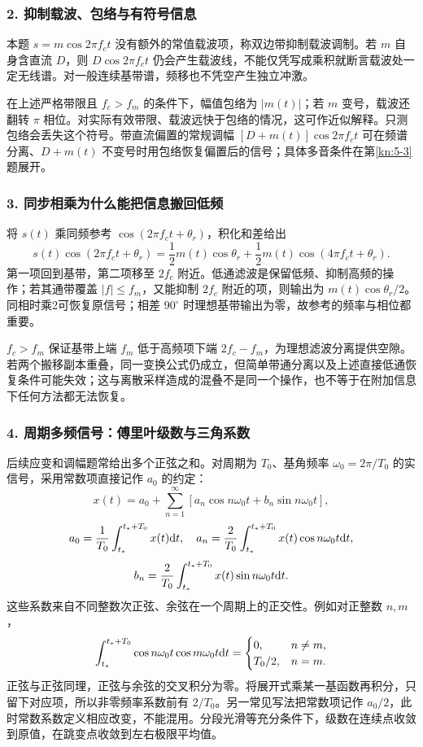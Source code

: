 \subsubsection*{2. 抑制载波、包络与有符号信息}
本题 $s=m\cos2\pi f_ct$ 没有额外的常值载波项，称双边带抑制载波调制。若 $m$ 自身含直流 $D$，则 $D\cos2\pi f_ct$ 仍会产生载波线，不能仅凭写成乘积就断言载波处一定无线谱。对一般连续基带谱，频移也不凭空产生独立冲激。

在上述严格带限且 $f_c>f_m$ 的条件下，幅值包络为 $|m(t)|$；若 $m$ 变号，载波还翻转 $\pi$ 相位。对实际有效带限、载波远快于包络的情况，这可作近似解释。只测包络会丢失这个符号。带直流偏置的常规调幅 $[D+m(t)]\cos2\pi f_ct$ 可在频谱分离、$D+m(t)$ 不变号时用包络恢复偏置后的信号；具体多音条件在第\ref{kn:5-3}题展开。

\subsubsection*{3. 同步相乘为什么能把信息搬回低频}
将 $s(t)$ 乘同频参考 $\cos(2\pi f_ct+\theta_r)$，积化和差给出
\[
s(t)\cos(2\pi f_ct+\theta_r)
=\frac12m(t)\cos\theta_r+
\frac12m(t)\cos(4\pi f_ct+\theta_r).
\]
第一项回到基带，第二项移至 $2f_c$ 附近。低通滤波是保留低频、抑制高频的操作；若其通带覆盖 $|f|\leq f_m$，又能抑制 $2f_c$ 附近的项，则输出为 $m(t)\cos\theta_r/2$。同相时乘2可恢复原信号；相差 $90^\circ$ 时理想基带输出为零，故参考的频率与相位都重要。

$f_c>f_m$ 保证基带上端 $f_m$ 低于高频项下端 $2f_c-f_m$，为理想滤波分离提供空隙。若两个搬移副本重叠，同一变换公式仍成立，但简单带通分离以及上述直接低通恢复条件可能失效；这与离散采样造成的混叠不是同一个操作，也不等于在附加信息下任何方法都无法恢复。

\subsubsection*{4. 周期多频信号：傅里叶级数与三角系数}
后续应变和调幅题常给出多个正弦之和。对周期为 $T_0$、基角频率 $\omega_0=2\pi/T_0$ 的实信号，采用常数项直接记作 $a_0$ 的约定：
\[
x(t)=a_0+\sum_{n=1}^\infty[a_n\cos n\omega_0t+b_n\sin n\omega_0t],
\]
\[
a_0=\frac1{T_0}\int_{t_*}^{t_*+T_0}x(t)\mathrm{d} t,\quad
a_n=\frac2{T_0}\int_{t_*}^{t_*+T_0}x(t)\cos n\omega_0t\mathrm{d} t,
\]
\[
b_n=\frac2{T_0}\int_{t_*}^{t_*+T_0}x(t)\sin n\omega_0t\mathrm{d} t.
\]
这些系数来自不同整数次正弦、余弦在一个周期上的正交性。例如对正整数 $n,m$，
\[
\int_{t_*}^{t_*+T_0}\cos n\omega_0t\cos m\omega_0t\mathrm{d} t
=\begin{cases}0,&n\ne m,\\T_0/2,&n=m.\end{cases}
\]
正弦与正弦同理，正弦与余弦的交叉积分为零。将展开式乘某一基函数再积分，只留下对应项，所以非零频率系数前有 $2/T_0$。另一常见写法把常数项记作 $a_0/2$，此时常数系数定义相应改变，不能混用。分段光滑等充分条件下，级数在连续点收敛到原值，在跳变点收敛到左右极限平均值。

